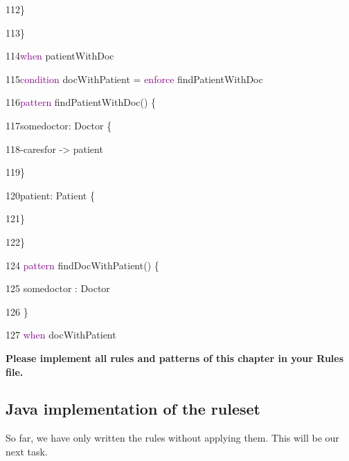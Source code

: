 {112\hspace{1cm}\}

113\hspace{0.5cm}\}

114\hspace{0.5cm}\textcolor{Purple}{when} patientWithDoc\newline

115\hspace{0.5cm}\textcolor{Purple}{condition} docWithPatient = \textcolor{Purple}{enforce} findPatientWithDoc

116\hspace{0.5cm}\textcolor{Purple}{pattern} findPatientWithDoc() \{

117\hspace{1cm}somedoctor: Doctor \{

118\hspace{1.5cm}-caresfor -> patient

119\hspace{1cm}\}

120\hspace{1cm}patient: Patient \{

121\hspace{1cm}\}

122\hspace{0.5cm}\}\newline

124	\hspace{0.5cm}\textcolor{Purple}{pattern} findDocWithPatient() \{

125	\hspace{1cm}	somedoctor : Doctor

126	\hspace{0.5cm}\}

127\hspace{0.5cm} \textcolor{Purple}{when} docWithPatient \newline\newline

}

\textbf{Please implement all rules and patterns of this chapter in your Rules file.}\newline

\subsection{Java implementation of the ruleset}

So far, we have only written the rules without applying them. This will be our next task.

